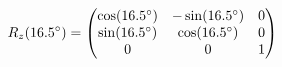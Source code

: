 \documentclass[preview]{standalone}
\begin{document}
\begin{align*}
\special{dvisvgm:raw <g id='unique000'>}R_z(16.5^\circ) = \begin{pmatrix} \cos(16.5^\circ) & -\sin(16.5^\circ) & 0 \\ \sin(16.5^\circ) & \cos(16.5^\circ) & 0 \\ 0 & 0 & 1 \end{pmatrix}\special{dvisvgm:raw </g>}
\end{align*}
\end{document}
